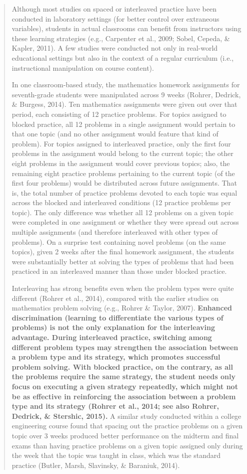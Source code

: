 \begin{quote}
Although most studies on spaced or interleaved practice have been
conducted in laboratory settings (for better control over extraneous
variables), students in actual classrooms can benefit from instructors
using these learning strategies (e.g., Carpenter et al., 2009; Sobel,
Cepeda, \& Kapler, 2011). A few studies were conducted not only in
real-world educational settings but also in the context of a regular
curriculum (i.e., instructional manipulation on course content).

In one classroom-based study, the mathematics homework assignments for
seventh-grade students were manipulated across 9 weeks (Rohrer, Dedrick,
\& Burgess, 2014). Ten mathematics assignments were given out over that
period, each consisting of 12 practice problems. For topics assigned to
blocked practice, all 12 problems in a single assignment would pertain
to that one topic (and no other assignment would feature that kind of
problem). For topics assigned to interleaved practice, only the first
four problems in the assignment would belong to the current topic; the
other eight problems in the assignment would cover previous topics;
also, the remaining eight practice problems pertaining to the current
topic (of the first four problems) would be distributed across future
assignments. That is, the total number of practice problems devoted to
each topic was equal across the blocked and interleaved conditions (12
practice problems per topic). The only difference was whether all 12
problems on a given topic were completed in one assignment or whether
they were spread out across multiple assignments (and therefore
interleaved with other types of problems). On a surprise test containing
novel problems (on the same topics), given 2 weeks after the final
homework assignment, the students were substantially better at solving
the types of problems that had been practiced in an interleaved manner
than those under blocked practice.

Interleaving has strong benefits even when the problem types were quite
different (Rohrer et al., 2014), compared with the earlier studies on
mathematics problem solving (e.g., Rohrer \& Taylor, 2007).
\textbf{Enhanced discrimination (learning to differentiate the various
types of problems) is not the only explanation for the interleaving
advantage. During interleaved practice, switching among different
problem types may strengthen the association between a problem type and
its strategy, which promotes successful problem solving. With blocked
practice, on the contrary, as all the problems require the same
strategy, the student needs only focus on executing a given strategy
repeatedly, which might not be as effective in reinforcing the
association between a problem type and its strategy (Rohrer et al.,
2014; see also Rohrer, Dedrick, \& Stershic, 2015). }A similar study
conducted within a college engineering course found that spacing out the
practice problems on a given topic over 3 weeks produced better
performance on the midterm and final exams than having practice problems
on a given topic assigned only during the week that the topic was taught
in class, which was the standard practice (Butler, Marsh, Slavinsky, \&
Baraniuk, 2014).


\end{quote}
